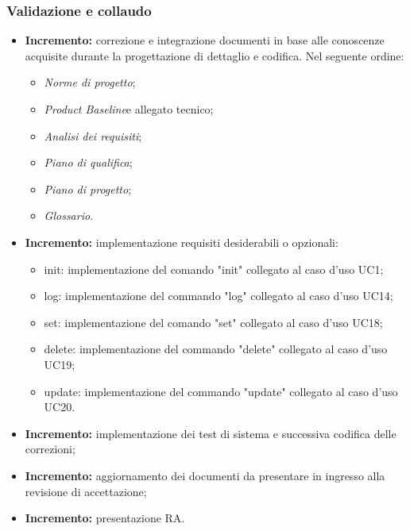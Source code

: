 \subsubsection{Validazione e collaudo }
\begin{itemize}
  \item \textbf{ Incremento:} correzione e integrazione documenti in base alle conoscenze acquisite durante la progettazione di dettaglio e codifica. Nel seguente ordine:
  \begin{itemize}
    \item \textit{Norme di progetto}\docs;
    \item \textit{Product Baseline}\glo e allegato tecnico;
    \item \textit{Analisi dei requisiti}\docs;
    \item \textit{Piano di qualifica}\docs;
    \item \textit{Piano di progetto}\docs;
    \item \textit{Glossario}\docs.
  \end{itemize}
	\item \textbf{ Incremento:} implementazione requisiti desiderabili o opzionali:
	\begin{itemize}
		\item init: implementazione del comando "init" collegato al caso d'uso UC1;
		\item log: implementazione del commando "log" collegato al caso d'uso UC14;
		\item set: implementazione del comando "set" collegato al caso d'uso UC18;
		\item delete: implementazione del commando "delete" collegato al caso d'uso UC19;
		\item update: implementazione del commando "update" collegato al caso d'uso UC20.
	\end{itemize}
	\item \textbf{ Incremento:} implementazione dei test di sistema e successiva codifica delle correzioni;
	\item \textbf{ Incremento:} aggiornamento dei documenti da presentare in ingresso alla revisione di accettazione;
	\item \textbf{ Incremento:} presentazione RA.
\end{itemize}
